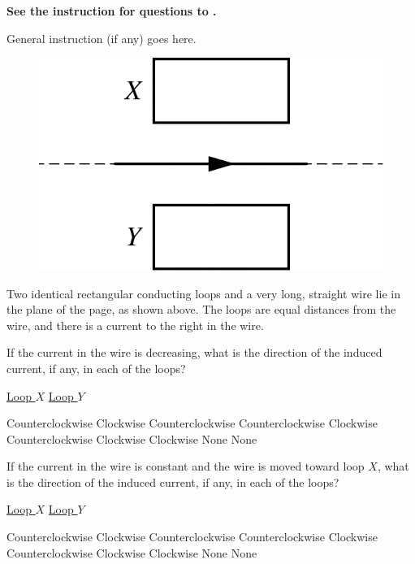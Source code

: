 \textbf{See the instruction for questions  to .}

General instruction (if any) goes here.

\begin{figure}[H]
\centering
\includegraphics[scale=0.25]{images/img-015-041.png}
\end{figure}
Two identical rectangular conducting loops and a very long, straight wire lie in the plane of the page, as shown above. The loops are equal distances from the wire, and there is a current to the right in the wire.

\begin{questions}\setcounter{question}{33}\question
If the current in the wire is decreasing, what is the direction of the induced current, if any, in each of the loops?

\tabto{0.75cm}\underline{Loop $X$}
\tabto{5.00cm}\underline{Loop $Y$}

\begin{choices}
\choice Counterclockwise \tabto{4.25cm} Clockwise
\choice Counterclockwise \tabto{4.25cm} Counterclockwise
\choice Clockwise        \tabto{4.25cm} Counterclockwise
\choice Clockwise        \tabto{4.25cm} Clockwise
\choice None             \tabto{4.25cm}  None
\end{choices}\end{questions}

\begin{questions}\setcounter{question}{34}\question
If the current in the wire is constant and the wire is moved toward loop $X$, what is the direction of the induced current, if any, in each of the loops?

\tabto{0.75cm}\underline{Loop $X$}
\tabto{5.00cm}\underline{Loop $Y$}

\begin{choices}
\choice Counterclockwise \tabto{4.25cm} Clockwise
\choice Counterclockwise \tabto{4.25cm} Counterclockwise
\choice Clockwise        \tabto{4.25cm} Counterclockwise
\choice Clockwise        \tabto{4.25cm} Clockwise
\choice None             \tabto{4.25cm}  None
\end{choices}\end{questions}

